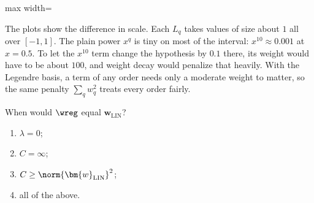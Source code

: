 \begin{center}
    \begin{adjustbox}{max width=\textwidth}
    \end{adjustbox}
\end{center}

The plots show the difference in scale. Each \(L_q\) takes values of size about
\(1\) all over \([-1, 1]\). The plain power \(x^q\) is tiny on most of the
interval: \(x^{10} \approx 0.001\) at \(x = 0.5\). To let the \(x^{10}\) term
change the hypothesis by \(0.1\) there, its weight would have to be about
\(100\), and weight decay would penalize that heavily. With the Legendre
basis, a term of any order needs only a moderate weight to matter, so the
same penalty \(\sum_q w_q^2\) treats every order fairly.

\begin{exercise}
    When would \(\wreg\) equal \(\bm{w}_{\mathrm{LIN}}\)?
    \begin{enumerate}[(1)]
        \item \(\lambda = 0\);
        \item \(C = \infty\);
        \item \(C \ge \norm{\bm{w}_{\mathrm{LIN}}}^2\);
        \item all of the above.
    \end{enumerate}
\end{exercise}

